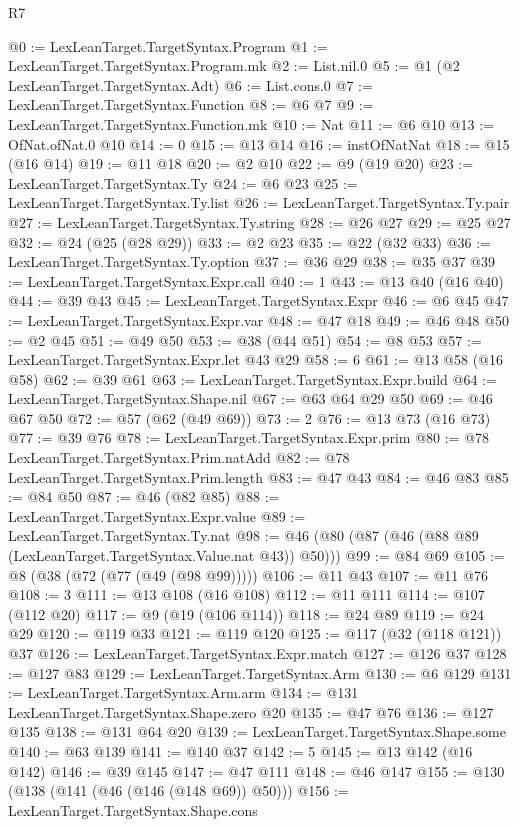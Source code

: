 \begin{lexlean}{R7}
\begin{coremodule}
@0 := LexLeanTarget.TargetSyntax.Program
@1 := LexLeanTarget.TargetSyntax.Program.mk
@2 := List.nil.{0}
@5 := @1 (@2 LexLeanTarget.TargetSyntax.Adt)
@6 := List.cons.{0}
@7 := LexLeanTarget.TargetSyntax.Function
@8 := @6 @7
@9 := LexLeanTarget.TargetSyntax.Function.mk
@10 := Nat
@11 := @6 @10
@13 := OfNat.ofNat.{0} @10
@14 := 0
@15 := @13 @14
@16 := instOfNatNat
@18 := @15 (@16 @14)
@19 := @11 @18
@20 := @2 @10
@22 := @9 (@19 @20)
@23 := LexLeanTarget.TargetSyntax.Ty
@24 := @6 @23
@25 := LexLeanTarget.TargetSyntax.Ty.list
@26 := LexLeanTarget.TargetSyntax.Ty.pair
@27 := LexLeanTarget.TargetSyntax.Ty.string
@28 := @26 @27
@29 := @25 @27
@32 := @24 (@25 (@28 @29))
@33 := @2 @23
@35 := @22 (@32 @33)
@36 := LexLeanTarget.TargetSyntax.Ty.option
@37 := @36 @29
@38 := @35 @37
@39 := LexLeanTarget.TargetSyntax.Expr.call
@40 := 1
@43 := @13 @40 (@16 @40)
@44 := @39 @43
@45 := LexLeanTarget.TargetSyntax.Expr
@46 := @6 @45
@47 := LexLeanTarget.TargetSyntax.Expr.var
@48 := @47 @18
@49 := @46 @48
@50 := @2 @45
@51 := @49 @50
@53 := @38 (@44 @51)
@54 := @8 @53
@57 := LexLeanTarget.TargetSyntax.Expr.let @43 @29
@58 := 6
@61 := @13 @58 (@16 @58)
@62 := @39 @61
@63 := LexLeanTarget.TargetSyntax.Expr.build
@64 := LexLeanTarget.TargetSyntax.Shape.nil
@67 := @63 @64 @29 @50
@69 := @46 @67 @50
@72 := @57 (@62 (@49 @69))
@73 := 2
@76 := @13 @73 (@16 @73)
@77 := @39 @76
@78 := LexLeanTarget.TargetSyntax.Expr.prim
@80 := @78 LexLeanTarget.TargetSyntax.Prim.natAdd
@82 := @78 LexLeanTarget.TargetSyntax.Prim.length
@83 := @47 @43
@84 := @46 @83
@85 := @84 @50
@87 := @46 (@82 @85)
@88 := LexLeanTarget.TargetSyntax.Expr.value
@89 := LexLeanTarget.TargetSyntax.Ty.nat
@98 := @46 (@80 (@87 (@46 (@88 @89 (LexLeanTarget.TargetSyntax.Value.nat @43)) @50)))
@99 := @84 @69
@105 := @8 (@38 (@72 (@77 (@49 (@98 @99)))))
@106 := @11 @43
@107 := @11 @76
@108 := 3
@111 := @13 @108 (@16 @108)
@112 := @11 @111
@114 := @107 (@112 @20)
@117 := @9 (@19 (@106 @114))
@118 := @24 @89
@119 := @24 @29
@120 := @119 @33
@121 := @119 @120
@125 := @117 (@32 (@118 @121)) @37
@126 := LexLeanTarget.TargetSyntax.Expr.match
@127 := @126 @37
@128 := @127 @83
@129 := LexLeanTarget.TargetSyntax.Arm
@130 := @6 @129
@131 := LexLeanTarget.TargetSyntax.Arm.arm
@134 := @131 LexLeanTarget.TargetSyntax.Shape.zero @20
@135 := @47 @76
@136 := @127 @135
@138 := @131 @64 @20
@139 := LexLeanTarget.TargetSyntax.Shape.some
@140 := @63 @139
@141 := @140 @37
@142 := 5
@145 := @13 @142 (@16 @142)
@146 := @39 @145
@147 := @47 @111
@148 := @46 @147
@155 := @130 (@138 (@141 (@46 (@146 (@148 @69)) @50)))
@156 := LexLeanTarget.TargetSyntax.Shape.cons

\end{coremodule}
\end{lexlean}
